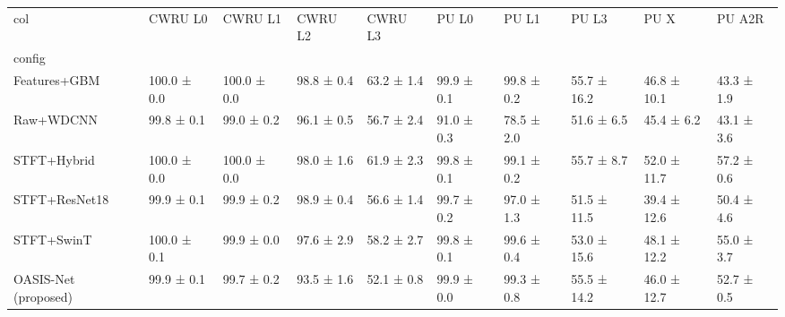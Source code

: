 \begin{tabular}{llllllllll}
\toprule
col & CWRU L0 & CWRU L1 & CWRU L2 & CWRU L3 & PU L0 & PU L1 & PU L3 & PU X & PU A2R \\
config &  &  &  &  &  &  &  &  &  \\
\midrule
Features+GBM & 100.0 ± 0.0 & 100.0 ± 0.0 & 98.8 ± 0.4 & 63.2 ± 1.4 & 99.9 ± 0.1 & 99.8 ± 0.2 & 55.7 ± 16.2 & 46.8 ± 10.1 & 43.3 ± 1.9 \\
Raw+WDCNN & 99.8 ± 0.1 & 99.0 ± 0.2 & 96.1 ± 0.5 & 56.7 ± 2.4 & 91.0 ± 0.3 & 78.5 ± 2.0 & 51.6 ± 6.5 & 45.4 ± 6.2 & 43.1 ± 3.6 \\
STFT+Hybrid & 100.0 ± 0.0 & 100.0 ± 0.0 & 98.0 ± 1.6 & 61.9 ± 2.3 & 99.8 ± 0.1 & 99.1 ± 0.2 & 55.7 ± 8.7 & 52.0 ± 11.7 & 57.2 ± 0.6 \\
STFT+ResNet18 & 99.9 ± 0.1 & 99.9 ± 0.2 & 98.9 ± 0.4 & 56.6 ± 1.4 & 99.7 ± 0.2 & 97.0 ± 1.3 & 51.5 ± 11.5 & 39.4 ± 12.6 & 50.4 ± 4.6 \\
STFT+SwinT & 100.0 ± 0.1 & 99.9 ± 0.0 & 97.6 ± 2.9 & 58.2 ± 2.7 & 99.8 ± 0.1 & 99.6 ± 0.4 & 53.0 ± 15.6 & 48.1 ± 12.2 & 55.0 ± 3.7 \\
OASIS-Net (proposed) & 99.9 ± 0.1 & 99.7 ± 0.2 & 93.5 ± 1.6 & 52.1 ± 0.8 & 99.9 ± 0.0 & 99.3 ± 0.8 & 55.5 ± 14.2 & 46.0 ± 12.7 & 52.7 ± 0.5 \\
\bottomrule
\end{tabular}
